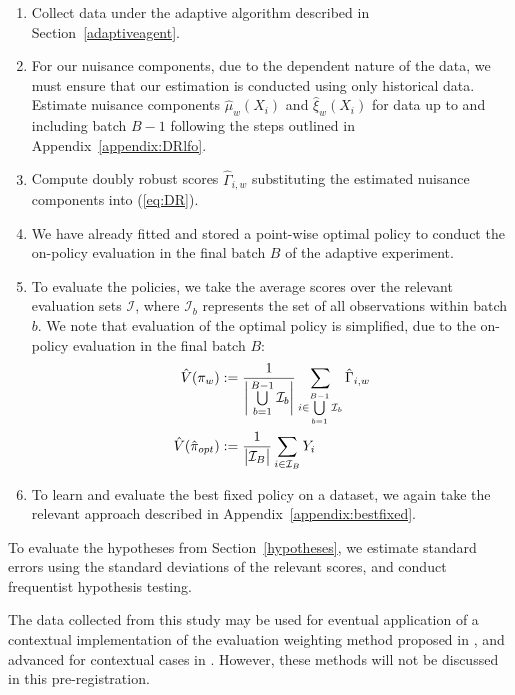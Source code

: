 \documentclass[letterpaper, 12pt, parskip=full,]{scrartcl}
\begin{document}
\begin{enumerate}
\item Collect data under the adaptive algorithm described in Section~\ref{adaptiveagent}. 
\item For our nuisance components, due to the dependent nature of the data, we must ensure that our estimation is conducted using only historical data. Estimate nuisance components $\hat{\mu}_{w}(X_i)$  and $\hat\xi_w(X_i)$ for data up to and including batch $B-1$ following the steps outlined in Appendix~\ref{appendix:DRlfo}. 
\item Compute doubly robust scores $\hat{\Gamma}_{i,w}$ substituting the estimated nuisance components into (\ref{eq:DR}). 
\item We have already fitted and stored a point-wise optimal policy to conduct the on-policy evaluation in the final batch $B$ of the adaptive experiment. 
  \item To evaluate the policies, we take the average scores over the relevant evaluation sets $\mathcal{I}$, where $\mathcal{I}_b$ represents the set of all observations within batch $b$. We note that evaluation of the optimal policy is simplified, due to the on-policy evaluation in the final batch $B$:
      \begin{align}
          \hat{V}({\pi}_{w})  &:= \frac{1}{\bigg{\lvert} \bigcup\limits_{b=1}^{B-1} \mathcal{I}_{b} \bigg{\rvert}} \sum_{i \in \bigcup\limits_{b=1}^{B-1} \mathcal{I}_{b} } \hat{\Gamma}_{i,w} \\
                     \hat{V}(\hat{\pi}_{opt})  &:= \frac{1}{\big{\lvert}  \mathcal{I}_{B} \big{\rvert}} \sum_{i \in \mathcal{I}_{B} }
                      Y_i  
    \end{align}
   \item To learn and evaluate the best fixed policy on a dataset, we again take the relevant approach described in Appendix~\ref{appendix:bestfixed}. 
\end{enumerate}

To evaluate the hypotheses from Section~\ref{hypotheses}, we estimate standard errors using the standard deviations of the relevant scores, and conduct frequentist hypothesis testing. 

The data collected from this study may be used for eventual application of a contextual implementation of the evaluation weighting method proposed in \cite{hadad2019confidence}, and advanced for contextual cases in \cite{zhan2020retrospective}. However, these methods will not be discussed in this pre-registration. 
\end{document}
